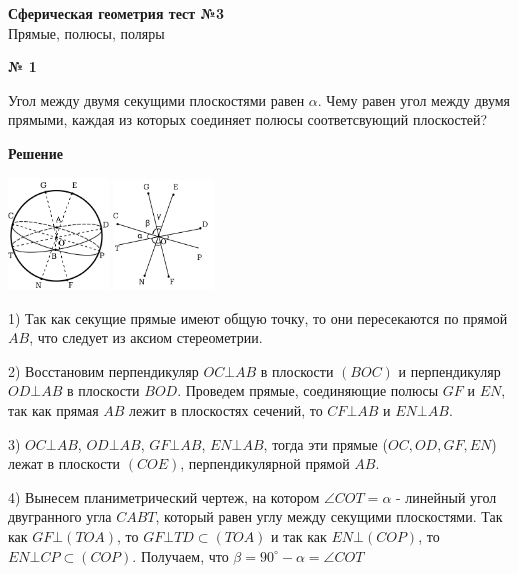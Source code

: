 


    \begin{center}
        \textbf{Сферическая геометрия тест №3}\\
        Прямые, полюсы, поляры
    \end{center}

    \begin{center}
        \textbf{№ 1}
    \end{center}

    Угол между двумя секущими плоскостями равен $\alpha$.
    Чему равен угол между двумя прямыми,
    каждая из которых соединяет полюсы соответсвующий плоскостей?

    \textbf{Решение}\\

    \begin{center}
        \includegraphics[width=0.2\textwidth]{images/img1} \quad
        \includegraphics[width=0.2\textwidth]{images/img2}\\
    \end{center}

    1) Так как секущие прямые имеют общую точку, то они пересекаются по прямой $AB$, что следует из аксиом стереометрии.

    2) Восстановим перпендикуляр $OC\bot AB$ в плоскости $(BOC)$ и перпендикуляр $OD \bot AB$ в плоскости $BOD$.
    Проведем прямые, соединяющие полюсы $GF$ и $EN$, так как прямая $AB$ лежит в плоскостях сечений,
    то $CF \bot AB$ и $EN \bot AB$.

    3) $OC \bot AB$, $OD \bot AB$, $GF \bot AB$, $EN \bot AB$,
    тогда эти прямые ($OC, OD, GF, EN$) лежат в плоскости $(COE)$, перпендикулярной прямой $AB$.

    4) Вынесем планиметрический чертеж, на котором $\angle COT = \alpha$ - линейный угол двугранного угла $CABT$,
    который равен углу между секущими плоскостями.
    Так как $GF \bot (TOA)$, то $GF \bot TD \subset (TOA)$ и так как $EN \bot (COP)$, то $EN \bot CP \subset (COP)$.
    Получаем, что $\beta = 90^\circ - \alpha = \angle COT$

